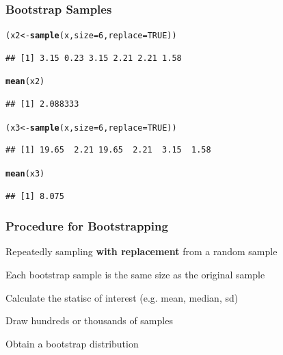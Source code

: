 \documentclass[12pt]{beamer}\usepackage[]{graphicx}\usepackage[]{color}
\makeatletter
\newcommand{\hlnum}[1]{\textcolor[rgb]{0.686,0.059,0.569}{#1}}%
\newcommand{\hlstd}[1]{\textcolor[rgb]{0.345,0.345,0.345}{#1}}%
\newcommand{\hlkwb}[1]{\textcolor[rgb]{0.69,0.353,0.396}{#1}}%
\newcommand{\hlkwc}[1]{\textcolor[rgb]{0.333,0.667,0.333}{#1}}%
\newcommand{\hlkwd}[1]{\textcolor[rgb]{0.737,0.353,0.396}{\textbf{#1}}}%
\newenvironment{kframe}{%
 \def\at@end@of@kframe{}%
 \ifinner\ifhmode%
  \def\at@end@of@kframe{\end{minipage}}%
  \begin{minipage}{\columnwidth}%
 \fi\fi%
 \def\FrameCommand##1{\hskip\@totalleftmargin \hskip-\fboxsep
 \colorbox{shadecolor}{##1}\hskip-\fboxsep
     \hskip-\linewidth \hskip-\@totalleftmargin \hskip\columnwidth}%
 \MakeFramed {\advance\hsize-\width
   \@totalleftmargin\z@ \linewidth\hsize
   \@setminipage}}%
 {\par\unskip\endMakeFramed%
 \at@end@of@kframe}
\newenvironment{knitrout}{}{} %
\makeatother
\begin{document}
\begin{frame}[fragile]
\frametitle{Bootstrap Samples}

\begin{knitrout}\footnotesize
{}\color{fgcolor}\begin{kframe}
\begin{alltt}
\hlstd{(x2} \hlkwb{<-} \hlkwd{sample}\hlstd{(x,} \hlkwc{size} \hlstd{=} \hlnum{6}\hlstd{,} \hlkwc{replace} \hlstd{=} \hlnum{TRUE}\hlstd{))}
\end{alltt}
\begin{verbatim}
## [1] 3.15 0.23 3.15 2.21 2.21 1.58
\end{verbatim}
\begin{alltt}
\hlkwd{mean}\hlstd{(x2)}
\end{alltt}
\begin{verbatim}
## [1] 2.088333
\end{verbatim}
\begin{alltt}
\hlstd{(x3} \hlkwb{<-} \hlkwd{sample}\hlstd{(x,} \hlkwc{size} \hlstd{=} \hlnum{6}\hlstd{,} \hlkwc{replace} \hlstd{=} \hlnum{TRUE}\hlstd{))}
\end{alltt}
\begin{verbatim}
## [1] 19.65  2.21 19.65  2.21  3.15  1.58
\end{verbatim}
\begin{alltt}
\hlkwd{mean}\hlstd{(x3)}
\end{alltt}
\begin{verbatim}
## [1] 8.075
\end{verbatim}
\end{kframe}
\end{knitrout}

\end{frame}


\begin{frame}
\frametitle{Procedure for Bootstrapping}

\bbi
  \item Repeatedly sampling \textbf{with replacement} from a random sample
  \item Each bootstrap sample is the same size as the original sample
  \item Calculate the statisc of interest (e.g. mean, median, sd)
  \item Draw hundreds or thousands of samples
  \item Obtain a bootstrap distribution
\ei

\end{frame}
\end{document}
